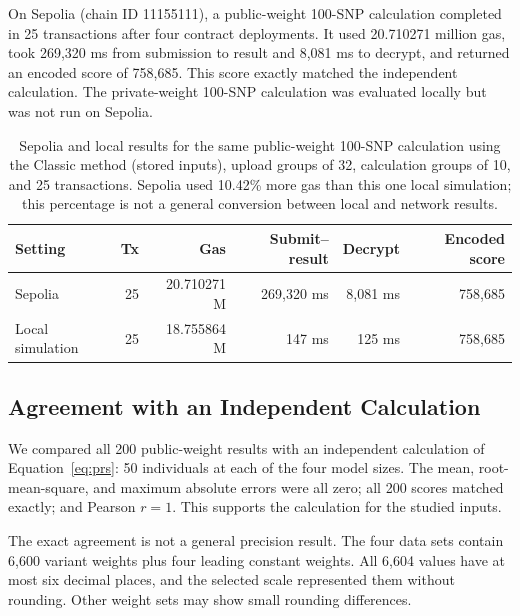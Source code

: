 \documentclass[10pt]{article}
\begin{document}
On Sepolia (chain ID 11155111), a public-weight 100-SNP calculation completed in 25
transactions after four contract deployments.  It used 20.710271 million gas, took
269,320 ms from submission to result and 8,081 ms to decrypt, and returned an encoded
score of 758,685.  This score exactly matched the independent calculation.  The
private-weight 100-SNP calculation was evaluated locally but was not run on Sepolia.

\begin{table}[t]
\centering
\caption{Sepolia and local results for the same public-weight 100-SNP calculation using the
Classic method (stored inputs), upload groups of 32, calculation groups of 10, and 25 transactions.
Sepolia used 10.42\% more gas than this one local simulation; this percentage is not a
general conversion between local and network results.}
\label{tab:live_validation}
\small
\begin{tabular}{lrrrrr}
\toprule
\textbf{Setting} & \textbf{Tx} & \textbf{Gas} & \textbf{Submit--result} & \textbf{Decrypt} & \textbf{Encoded score} \\
\midrule
Sepolia & 25 & 20.710271 M & 269,320 ms & 8,081 ms & 758,685 \\
Local simulation & 25 & 18.755864 M & 147 ms & 125 ms & 758,685 \\
\bottomrule
\end{tabular}
\end{table}

\subsection{Agreement with an Independent Calculation}

We compared all 200 public-weight results with an independent calculation of
Equation~\ref{eq:prs}: 50 individuals at each of the
four model sizes.  The mean,
root-mean-square, and maximum absolute errors were all zero; all 200 scores matched
exactly; and Pearson $r=1$.  This supports the calculation for the studied inputs.

The exact agreement is not a general precision result.  The four data sets contain
6,600 variant weights plus four leading constant weights.  All 6,604 values have at
most six decimal places, and the selected scale represented them without rounding.
Other weight sets may show small rounding differences.
\end{document}
